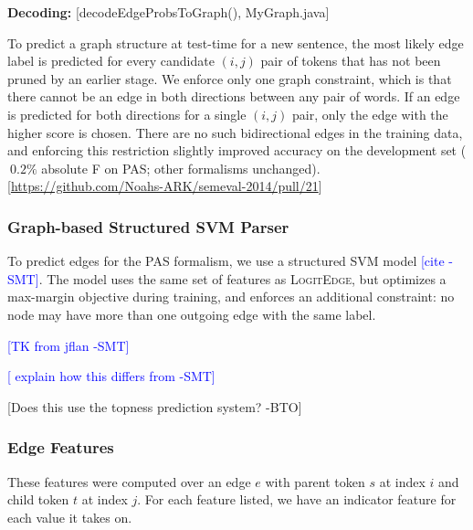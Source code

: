 \documentclass[11pt]{article}
\newcommand{\bocomment}[1]{\textcolor{Bittersweet}{[#1 -BTO]}}
\newcommand{\sam}[1]{\textcolor{blue}{[#1 -SMT]}}
\newcommand{\codenote}[1]{\textcolor{PineGreen}{[#1]}}
\newcommand{\logitedge}{\textsc{LogitEdge}}
\begin{document}


\textbf{Decoding:}
\codenote{decodeEdgeProbsToGraph(), MyGraph.java}

To predict a graph structure at test-time for a new sentence,
the most likely edge label is predicted for every candidate $(i, j)$ pair of
tokens that has not been pruned by an earlier stage.
We enforce only one graph constraint, which is that there cannot be
an edge in both directions between any pair of words.
If an edge is predicted for both directions for a single $(i, j)$
pair, only the edge with the higher score is chosen.
There are no such bidirectional edges in the training data, and enforcing this
restriction slightly improved accuracy on the development set ($~0.2\%$ absolute F on PAS; other formalisms unchanged).\codenote{\url{https://github.com/Noahs-ARK/semeval-2014/pull/21}}


\subsubsection{Graph-based Structured SVM Parser} \label{s:graphparser}

To predict edges for the PAS formalism, we use a structured SVM model
\sam{cite}.
The model uses the same set of features as \logitedge, but optimizes a
max-margin objective during training, and enforces an additional constraint: no
node may have more than one outgoing edge with the same label.

\sam{TK from jflan}

\sam{
explain how this differs from 
\cite{flanigan-etal:ACL2014}
}

\bocomment{Does this use the topness prediction system?}



\subsubsection{Edge Features}
\label{s:edgefeatures}

\label{s:features}
These features were computed over an edge $e$ with parent token $s$ at index
$i$ and child token $t$ at index $j$. 
For each feature listed, we have an indicator feature for each value it takes
on.
\end{document}
